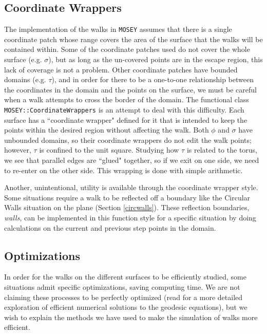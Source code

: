 \documentclass[12pt]{article}
\newcommand{\MOSEY}{\texttt{MOSEY}}
\begin{document}
	\subsection{Coordinate Wrappers} \label{sect:coordwrap}
		The implementation of the walks in \MOSEY{} assumes that there is a single coordinate patch whose range covers the area of the surface that the walks will be contained within.
		Some of the coordinate patches used do not cover the whole surface (e.g. $\sigma$), but as long as the un-covered points are in the escape region, this lack of coverage is not a problem.
		Other coordinate patches have bounded domains (e.g. $\tau$), and in order for there to be a one-to-one relationship between the coordinates in the domain and the points on the surface, we must be careful when a walk attempts to cross the border of the domain.
		The functional class \texttt{MOSEY::CoordinateWrappers} is an attempt to deal with this difficulty.
		Each surface has a ``coordinate wrapper" defined for it that is intended to keep the points within the desired region without affecting the walk.
		Both $\phi$ and $\sigma$ have unbounded domains, so their coordinate wrappers do not edit the walk points; however, $\tau$ is confined to the unit square.
		Studying how $\tau$ is related to the torus, we see that parallel edges are ``glued" together, so if we exit on one side, we need to re-enter on the other side.
		This wrapping is done with simple arithmetic.
		
		Another, unintentional, utility is available through the coordinate wrapper style.
		Some situations require a walk to be reflected off a boundary like the Circular Walls situation on the plane (Section \ref{circwalls}).
		These reflection boundaries, \emph{walls}, can be implemented in this function style for a specific situation by doing calculations on the current and previous step points in the domain.
		
	\subsection{Optimizations}
		In order for the walks on the different surfaces to be efficiently studied, some situations admit specific optimizations, saving computing time.
		We are not claiming these processes to be perfectly optimized (read \cite{Redfield_NumericalGeodesics_2007} for a more detailed exploration of efficient numerical solutions to the geodesic equations), but we wish to explain the methods we have used to make the simulation of walks more efficient.
		
\end{document}
